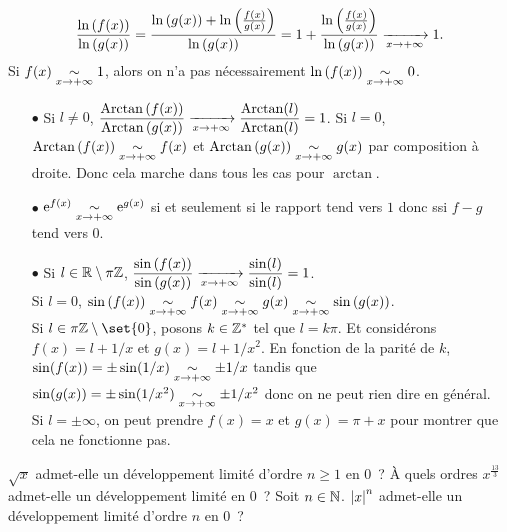 \documentclass{magnolia}
\begin{document}
\begin{sol}
\begin{questions}
\question 
  \begin{questions}
  \question \[\frac{\ln\left(f(x)\right)}{\ln\left(g(x)\right)}=\frac{\ln\left(g(x)\right)+\ln\left(\frac{f(x)}{g(x)}\right)}{\ln\left(g(x)\right)}=1+\frac{\ln\left(\frac{f(x)}{g(x)}\right)}{\ln\left(g(x)\right)}\xrightarrow[x\rightarrow +\infty]{}{1}.\]
  \question Si $f(x)\underset{x\rightarrow +\infty}{\sim}1$, alors on n'a pas nécessairement $\ln\left(f(x)\right)\underset{x\rightarrow +\infty}{\sim}0$.
  \end{questions}
\question 
\begin{itemize}
\item [$\bullet$] Si $l\neq 0$, $\dfrac{\operatorname{Arctan}\left(f(x)\right)}{\operatorname{Arctan}\left(g(x)\right)}\xrightarrow[x\rightarrow +\infty]{}{\dfrac{\operatorname{Arctan}(l)}{\operatorname{Arctan}(l)}}=1$. Si $l=0$, $\operatorname{Arctan}\left(f(x)\right)\underset{x\rightarrow +\infty}{\sim}f(x)$ et $\operatorname{Arctan}\left(g(x)\right)\underset{x\rightarrow +\infty}{\sim}g(x)$ par composition à droite. Donc cela marche dans tous les cas pour $\arctan$.
\item [$\bullet$] 
${\rm e}^{f(x)}\underset{x\rightarrow +\infty}{\sim} {\rm e}^{g(x)}$ si et seulement si le rapport tend vers $1$ donc ssi $f-g$ tend vers $0$.
\item [$\bullet$] Si $l\in \mathbb{R}\setminus\pi\mathbb{Z}$, $\dfrac{\sin\left(f(x)\right)}{\sin\left(g(x)\right)}\xrightarrow[x\rightarrow +\infty]{}{\dfrac{\sin(l)}{\sin(l)}}=1$.\\
Si $l=0$, $\sin\left(f(x)\right)\underset{x\rightarrow +\infty}{\sim}f(x)\underset{x\rightarrow +\infty}{\sim}g(x)\underset{x\rightarrow +\infty}{\sim}\sin\left(g(x)\right)$.\\
Si $l\in \pi\Z\setminus{\set{0}}$, posons $k\in \mathbb{Z}^*$ tel que $l=k\pi$. Et considérons $f(x)=l+1/x$ et $g(x)=l+1/x^2$. En fonction de la parité de $k$, $\sin(f(x))=\pm\sin(1/x)\underset{x\rightarrow +\infty}{\sim}\pm 1/x$ tandis que $\sin(g(x))=\pm\sin(1/x^2)\underset{x\rightarrow +\infty}{\sim}\pm 1/x^2$ donc on ne peut rien dire en général.\\
Si $l=\pm \infty$, on peut prendre $f(x)=x$ et $g(x)=\pi+x$ pour montrer que cela ne fonctionne pas.
\end{itemize}
\end{questions}
\end{sol}








\begin{questions}
\question $\sqrt{x}$ admet-elle un développement limité d'ordre $n\geq 1$ en
  0~?
\question À quels ordres $x^{\frac{13}{3}}$ admet-elle un développement
  limité en 0~?
\question Soit $n\in\mathbb{N}$. $\left|x\right|^n$ admet-elle un développement limité
  d'ordre $n$ en 0~? 
\end{questions}
\end{document}
